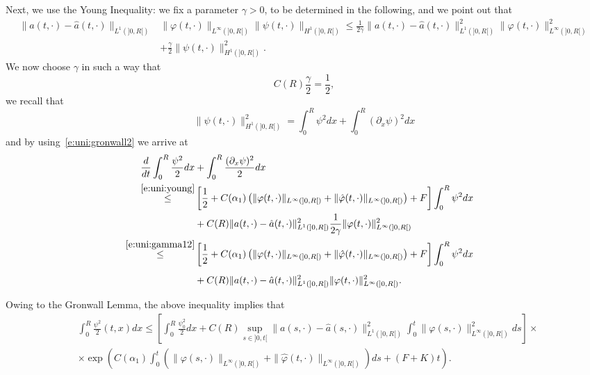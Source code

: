 \documentclass[11pt,leqno]{amsart}
\numberwithin{equation}{section}
\begin{document}
Next, we use the Young Inequality: we fix a parameter $\gamma>0$, to be determined in the following, 
and we point out that 
\begin{equation}
  \label{e:uni:young}
  \begin{split}
    \| a (t, \cdot) - \hat a (t, \cdot) \|_{L^1 (]0, R[)} & \| {\varphi}
    (t, \cdot) \|_{L^\infty (]0, R[)} \| \psi (t, \cdot) \|_{H^1 (]0,
      R[)} \leq \frac{1}{2 \gamma} \| a (t, \cdot) - \hat a (t, \cdot)
    \|^2_{L^1 (]0, R[)}
    \| {\varphi} (t, \cdot) \|^2_{L^\infty (]0, R[)} \\
    & + \frac{\gamma}{2} \| \psi (t, \cdot) \|^2_{H^1 (]0, R[)}.
  \end{split}
\end{equation}
We now choose $\gamma$  in such a way that 
\begin{equation}
\label{e:uni:gamma12}
    C(R) \frac{\gamma}{2} =
    \frac{1}{2}, 
\end{equation}
we recall that 
$$
    \| \psi (t, \cdot) \|^2_{H^1 (]0, R[)} = 
    \int_0^R \psi^2 dx + \int_0^R ({\partial_x } \psi)^2 dx  
$$
and by using~\eqref{e:uni:gronwall2} we arrive at
\begin{equation}
  \label{e:uni:intermedia}
  \begin{split}
    \frac{d}{dt } \int_0^R \frac{\psi^2}{2} dx & +
    \int_0^R \frac{ ({\partial_x } \psi)^2}{2} dx 
    \\
    \stackrel{\eqref{e:uni:young}}{\leq} & \left[ \frac{1}{2} +
      C(\alpha_1)  \left(\| {\varphi} (t, \cdot) \|_{L^\infty (]0, R[)}
      + \| \hat{\varphi} (t, \cdot) \|_{L^\infty (]0, R[)} \right)
      + F \right] \int_0^R \psi^2 dx 
    \\
    & + C(R) \| a (t, \cdot) - \hat a (t, \cdot) \|^2_{L^1 (]0, R[)}
    \frac{1}{2 \gamma}  \| {\varphi} (t, \cdot) \|^2_{L^\infty (]0, R[)} 
    \\
    \stackrel{\eqref{e:uni:gamma12}}{\leq}& \left[ \frac{1}{2}+
      C(\alpha_1)
      \left(\| {\varphi} (t, \cdot) \|_{L^\infty (]0, R[)}
        + \| \hat{\varphi} (t, \cdot) \|_{L^\infty (]0, R[)}\right)
      + F \right]\int_0^R \psi^2 dx \phantom{\int}
    \\
    & + C(R) \| a (t, \cdot) - \hat a (t, \cdot) \|^2_{L^1 (]0, R[)}
    \| {\varphi} (t, \cdot) \|^2_{L^\infty (]0, R[)} .  \phantom{\int}
  \end{split}
\end{equation}
Owing to the Gronwall Lemma, the above inequality implies that 
\begin{equation}
  \label{e:uni:stima1}
  \begin{split}
    & \int_0^R \frac{\psi^2}{2}(t, x) dx \leq \left[ \int_0^R
      \frac{\psi^2_0}{2} dx + C(R) \sup_{s \in ]0, t[ } \| a (s,
      \cdot) - \hat a (s, \cdot) \|^2_{L^1 (]0, R[)} \int_0^t \| {\varphi}
      (s, \cdot) \|^2_{L^\infty (]0, R[)} ds
    \right] \times
    \\
    & \times \exp \left( C(\alpha_1) \int_0^t \left(\| {\varphi} (s, \cdot)
      \|_{L^\infty (]0, R[)}
      +\| \hat{\varphi} (t, \cdot) \|_{L^\infty (]0, R[)}\right) ds + (F+K) t \right).
  \end{split}
\end{equation}
\end{document}
